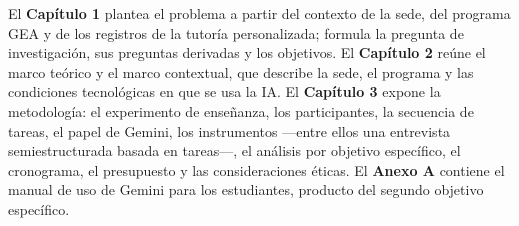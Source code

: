El \textbf{Capítulo 1} plantea el problema a partir del contexto de la sede, del
programa GEA y de los registros de la tutoría personalizada; formula la pregunta
de investigación, sus preguntas derivadas y los objetivos. El \textbf{Capítulo 2}
reúne el marco teórico y el marco contextual, que describe la sede, el programa y
las condiciones tecnológicas en que se usa la IA. El \textbf{Capítulo 3} expone la
metodología: el experimento de enseñanza, los participantes, la secuencia de
tareas, el papel de Gemini, los instrumentos ---entre ellos una entrevista
semiestructurada basada en tareas---, el análisis por objetivo específico, el
cronograma, el presupuesto y las consideraciones éticas. El \textbf{Anexo A}
contiene el manual de uso de Gemini para los estudiantes, producto del segundo
objetivo específico.

\clearpage
\newpage
